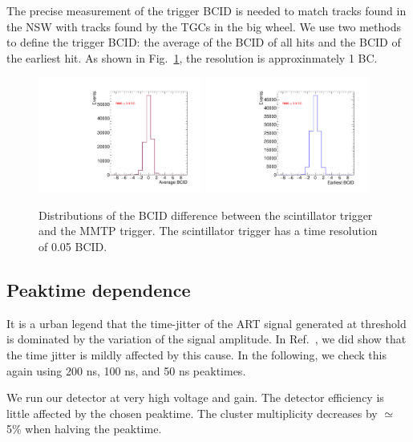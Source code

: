 The  precise measurement of the trigger BCID  is needed to match tracks found in the NSW with tracks found by the TGCs in
 the big wheel.
 We use two methods to define the trigger BCID: the average of the BCID of all hits and the BCID of the earliest hit.
 As shown in  Fig.~\ref{fig:timeres}, the resolution is approxinmately 1 BC.
\begin{figure}[!htpb]
  \begin{center}
    \includegraphics[width=0.48\textwidth]{figures/gbtanalysis3522/avg_BCID.pdf}
    \includegraphics[width=0.48\textwidth]{figures/gbtanalysis3522/earliest_BCID.pdf}
  \end{center}
  \vspace{-10pt}
  \caption{Distributions of the BCID difference between the scintillator trigger and the MMTP trigger.
  The scintillator trigger has a time resolution of 0.05 BCID.}          
  \label{fig:timeres}
\end{figure}
\subsection{Peaktime dependence}
\label{sec:perf-integ}
It is a urban legend that the time-jitter of the ART signal generated at threshold is dominated by the variation of the signal
amplitude. In Ref.~\cite{oldart}, we did show that the time jitter is mildly affected by this cause.
In the following, we check this again using  200 ns, 100 ns, and 50 ns peaktimes.

We run our detector at very high voltage and gain. The detector efficiency is little affected by the chosen peaktime. The cluster multiplicity
decreases by $\simeq$ 5\% when halving the peaktime.

